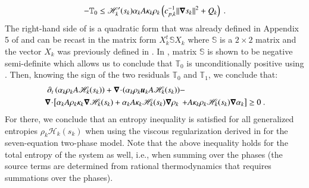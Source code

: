 \documentclass[preprint,10pt]{elsarticle}
\begin{document}
\begin{appendices}
%
\begin{equation}\label{eq:new_quad_form}
- \mathbb{T}_0 \leq \mathscr{H}_k'(s_k) \alpha_k A \kappa_k \rho_k \left( c_{p,k}^{-1} \|\boldsymbol\nabla s_k\|^2 +  Q_k\right) \ .
\end{equation}
%
The right-hand side of  is a quadratic form that was already defined in Appendix 5 of \cite{jlg} and can be recast in the matrix form $X^t_k \mathbb{S} X_k$ where $\mathbb{S}$ is a $2 \times 2$ matrix and the vector $X_k$ was previously defined in . In \cite{jlg}, matrix $\mathbb{S}$ is shown to be negative semi-definite which allows us to conclude that $\mathbb{T}_0$ is unconditionally positive using . Then, knowing the sign of the two residuals $\mathbb{T}_0$ and $\mathbb{T}_1$, we conclude that:
%
\begin{align}\label{eq:ent-res-7-eqn-diss-terms-app4}
\partial_t \left( \alpha_k \rho_k A \mathscr{H}_k(s_k)\right) + \boldsymbol\nabla\! \cdot \! \left( \alpha_k \rho_k \boldsymbol u_k A \mathscr{H}_k(s_k) \right)  &- \nonumber\\
\boldsymbol\nabla\! \cdot \! \left[ \alpha_k A \rho_k \kappa_k \boldsymbol\nabla \mathscr{H}_k (s_k) + \alpha_k A \kappa_k \mathscr{H}_k (s_k) \boldsymbol\nabla \rho_k  \right. & \left. + A \kappa_k \rho_k \mathscr{H}_k (s_k) \boldsymbol\nabla \alpha_k\right] \geq 0 \ .\nonumber 
\end{align}
%
For there, we conclude that an entropy inequality is satisfied for all generalized entropies $\rho_k \mathscr{H}_k (s_k)$ when using the viscous regularization derived in  for the seven-equation two-phase model. Note that the above inequality holds for the total entropy of the system as well, i.e., when summing over the phases (the source terms are determined from rational thermodynamics that requires summations over the phases).
\end{appendices}
\end{document}

